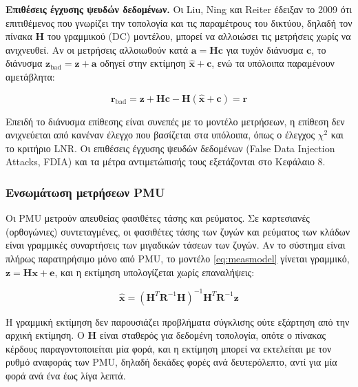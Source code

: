 \textbf{Επιθέσεις έγχυσης ψευδών δεδομένων.} Οι Liu, Ning και Reiter έδειξαν το 2009 ότι
επιτιθέμενος που γνωρίζει την τοπολογία και τις παραμέτρους του δικτύου, δηλαδή τον πίνακα
$\mathbf{H}$ του γραμμικού (DC) μοντέλου, μπορεί να αλλοιώσει τις μετρήσεις χωρίς να
ανιχνευθεί. Αν οι μετρήσεις αλλοιωθούν κατά $\mathbf{a} = \mathbf{H}\mathbf{c}$ για τυχόν
διάνυσμα $\mathbf{c}$, το διάνυσμα $\mathbf{z}_{\text{bad}} = \mathbf{z} + \mathbf{a}$ οδηγεί
στην εκτίμηση $\hat{\mathbf{x}} + \mathbf{c}$, ενώ τα υπόλοιπα παραμένουν αμετάβλητα:

\begin{equation}
\mathbf{r}_{\text{bad}} = \mathbf{z} + \mathbf{H}\mathbf{c}
        - \mathbf{H}(\hat{\mathbf{x}} + \mathbf{c}) = \mathbf{r}
\label{eq:fdia}
\end{equation}

Επειδή το διάνυσμα επίθεσης είναι συνεπές με το μοντέλο μετρήσεων, η επίθεση δεν
ανιχνεύεται από κανέναν έλεγχο που βασίζεται στα υπόλοιπα, όπως ο έλεγχος $\chi^2$ και το
κριτήριο LNR. Οι επιθέσεις έγχυσης ψευδών δεδομένων (False Data Injection Attacks, FDIA) και
τα μέτρα αντιμετώπισής τους εξετάζονται στο Κεφάλαιο 8.

\subsubsection*{Ενσωμάτωση μετρήσεων PMU}

Οι PMU μετρούν απευθείας φασιθέτες τάσης και ρεύματος. Σε καρτεσιανές (ορθογώνιες)
συντεταγμένες, οι φασιθέτες τάσης των ζυγών και ρεύματος των κλάδων είναι γραμμικές
συναρτήσεις των μιγαδικών τάσεων των ζυγών. Αν το σύστημα είναι πλήρως παρατηρήσιμο μόνο από
PMU, το μοντέλο \eqref{eq:measmodel} γίνεται γραμμικό,
$\mathbf{z} = \mathbf{H}\mathbf{x} + \mathbf{e}$, και η εκτίμηση υπολογίζεται χωρίς
επαναλήψεις:

\begin{equation}
\hat{\mathbf{x}} = \left(\mathbf{H}^{T}\mathbf{R}^{-1}\mathbf{H}\right)^{-1}
                    \mathbf{H}^{T}\mathbf{R}^{-1}\mathbf{z}
\label{eq:linse}
\end{equation}

Η γραμμική εκτίμηση δεν παρουσιάζει προβλήματα σύγκλισης ούτε εξάρτηση από την αρχική
εκτίμηση. Ο $\mathbf{H}$ είναι σταθερός για δεδομένη τοπολογία, οπότε ο πίνακας κέρδους
παραγοντοποιείται μία φορά, και η εκτίμηση μπορεί να εκτελείται με τον ρυθμό αναφοράς των
PMU, δηλαδή δεκάδες φορές ανά δευτερόλεπτο, αντί για μία φορά ανά ένα έως λίγα λεπτά.

